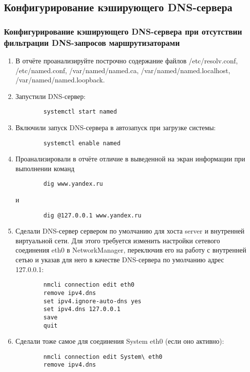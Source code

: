 \subsection{Конфигурирование кэширующего DNS-сервера}
\subsubsection{Конфигурирование кэширующего DNS-сервера при отсутствии фильтрации DNS-запросов маршрутизаторами}
\begin{enumerate}
    \item В отчёте проанализируйте построчно содержание файлов /etc/resolv.conf, /etc/named.conf, /var/named/named.ca, /var/named/named.localhost, /var/named/named.loopback.
    \item Запустили DNS-сервер:
        \begin{verbatim}
        systemctl start named
        \end{verbatim}
    \item Включили запуск DNS-сервера в автозапуск при загрузке системы:
        \begin{verbatim}
        systemctl enable named
        \end{verbatim}
    \item Проанализировали в отчёте отличие в выведенной на экран информации при выполнении команд
        \begin{verbatim}
        dig www.yandex.ru
        \end{verbatim}
    и
        \begin{verbatim}
        dig @127.0.0.1 www.yandex.ru
        \end{verbatim}
    \item Сделали DNS-сервер сервером по умолчанию для хоста server и внутренней виртуальной сети. Для этого требуется изменить настройки сетевого соединения eth0 в NetworkManager, переключив его на работу с внутренней сетью и указав для него в качестве DNS-сервера по умолчанию адрес 127.0.0.1:
        \begin{verbatim}
        nmcli connection edit eth0
        remove ipv4.dns
        set ipv4.ignore-auto-dns yes
        set ipv4.dns 127.0.0.1
        save
        quit
        \end{verbatim}
    \item Сделали тоже самое для соединения System eth0 (если оно активно):
        \begin{verbatim}
        nmcli connection edit System\ eth0
        remove ipv4.dns

\end{verbatim}
\end{enumerate}
